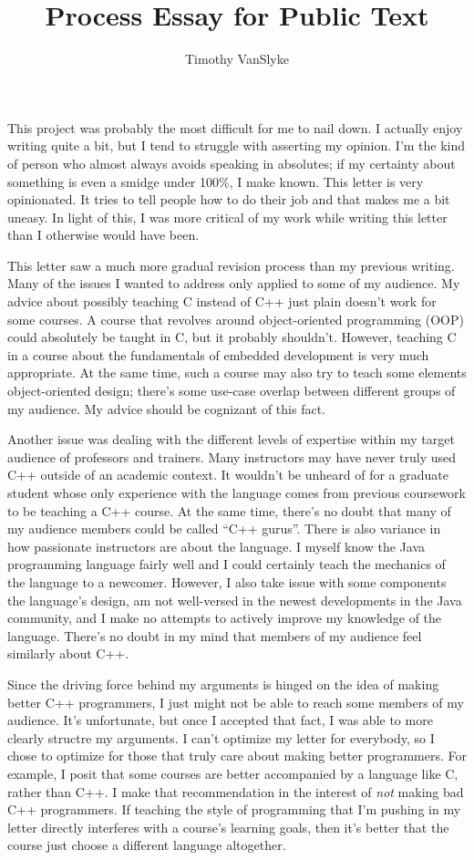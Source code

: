\documentclass{article}
\title{Process Essay for Public Text}
\author{Timothy VanSlyke}
\begin{document}
\raggedright
\maketitle
This project was probably the most difficult for me to nail down.  I actually enjoy writing quite a bit, but I tend to struggle with asserting my opinion.  I'm the kind of person who almost always avoids speaking in absolutes; if my certainty about something is even a smidge under 100\%, I make known.  This letter is very opinionated.  It tries to tell people how to do their job and that makes me a bit uneasy.  In light of this, I was more critical of my work while writing this letter than I otherwise would have been.

This letter saw a much more gradual revision process than my previous writing.  Many of the issues I wanted to address only applied to some of my audience.  My advice about possibly teaching C instead of C++ just plain doesn't work for some courses.  A course that revolves around object-oriented programming (OOP) could absolutely be taught in C, but it probably shouldn't.  However, teaching C in a course about the fundamentals of embedded development is very much appropriate.  At the same time, such a course may also try to teach some elements object-oriented design; there's some use-case overlap between different groups of my audience.  My advice should be cognizant of this fact.

Another issue was dealing with the different levels of expertise within my target audience of professors and trainers.  Many instructors may have never truly used C++ outside of an academic context. It wouldn't be unheard of for a graduate student whose only experience with the language comes from previous coursework to be teaching a C++ course.  At the same time, there's no doubt that many of my audience members could be called ``C++ gurus''.  There is also variance in how passionate instructors are about the language.  I myself know the Java programming language fairly well and I could certainly teach the mechanics of the language to a newcomer.  However, I also take issue with some components the language's design, am not well-versed in the newest developments in the Java community, and I make no attempts to actively improve my knowledge of the language.  There's no doubt in my mind that members of my audience feel similarly about C++.

Since the driving force behind my arguments is hinged on the idea of making better C++ programmers, I just might not be able to reach some members of my audience.  It's unfortunate, but once I accepted that fact, I was able to more clearly structre my arguments.  I can't optimize my letter for everybody, so I chose to optimize for those that truly care about making better programmers.  For example, I posit that some courses are better accompanied by a language like C, rather than C++.  I make that recommendation in the interest of \emph{not} making bad C++ programmers.  If teaching the style of programming that I'm pushing in my letter directly interferes with a course's learning goals, then it's better that the course just choose a different language altogether.
\end{document}
